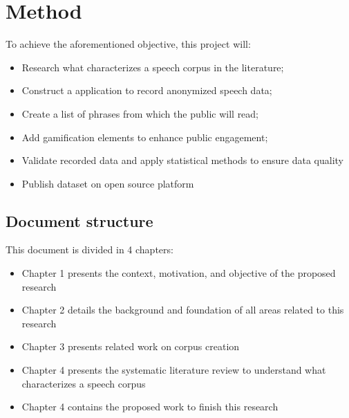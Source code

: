 \chapter{Method}

To achieve the aforementioned objective, this project will:

\begin{itemize}
    \item Research what characterizes a speech corpus in the literature;
    \item Construct a application to record anonymized speech data;
    \item Create a list of phrases from which the public will read;
    \item Add gamification elements to enhance public engagement;
    \item Validate recorded data and apply statistical methods to ensure data quality
    \item Publish dataset on open source platform
\end{itemize}

\section{Document structure}

This document is divided in 4 chapters:

\begin{itemize}
    \item Chapter 1 presents the context, motivation, and objective of the proposed research
    \item Chapter 2 details the background and foundation of all areas related to this research
    \item Chapter 3 presents related work on corpus creation
    \item Chapter 4 presents the systematic literature review to understand what characterizes a speech corpus
    \item Chapter 4 contains the proposed work to finish this research
\end{itemize}
